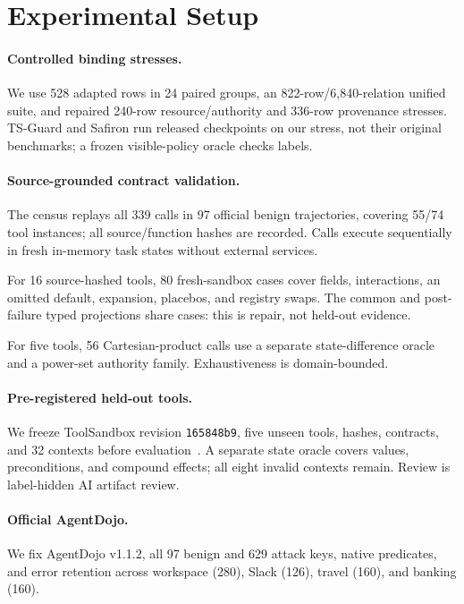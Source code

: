\section{Experimental Setup}
\label{sec:experimental-setup}

\paragraph{Controlled binding stresses.}
We use 528 adapted rows in 24 paired groups, an 822-row/6,840-relation unified
suite, and repaired 240-row resource/authority and 336-row provenance stresses.
TS-Guard and Safiron run released checkpoints on our stress, not their original
benchmarks; a frozen visible-policy oracle checks labels.

\paragraph{Source-grounded contract validation.}
The census replays all 339 calls in 97 official benign trajectories, covering
55/74 tool instances; all source/function hashes are recorded. Calls execute
sequentially in fresh in-memory task states without external services.

For 16 source-hashed tools, 80 fresh-sandbox cases cover fields, interactions,
an omitted default, expansion, placebos, and registry swaps. The common and
post-failure typed projections share cases: this is repair, not held-out evidence.

For five tools, 56 Cartesian-product calls use a separate state-difference
oracle and a power-set authority family. Exhaustiveness is domain-bounded.

\paragraph{Pre-registered held-out tools.}
We freeze ToolSandbox revision \texttt{165848b9}, five unseen tools, hashes,
contracts, and 32 contexts before evaluation~\cite{lu-etal-2025-toolsandbox}.
A separate state oracle covers values, preconditions, and compound effects;
all eight invalid contexts remain. Review is label-hidden AI artifact review.

\paragraph{Official AgentDojo.}
We fix AgentDojo v1.1.2, all 97 benign and 629 attack keys, native predicates,
and error retention across workspace (280), Slack (126), travel (160), and
banking (160).


